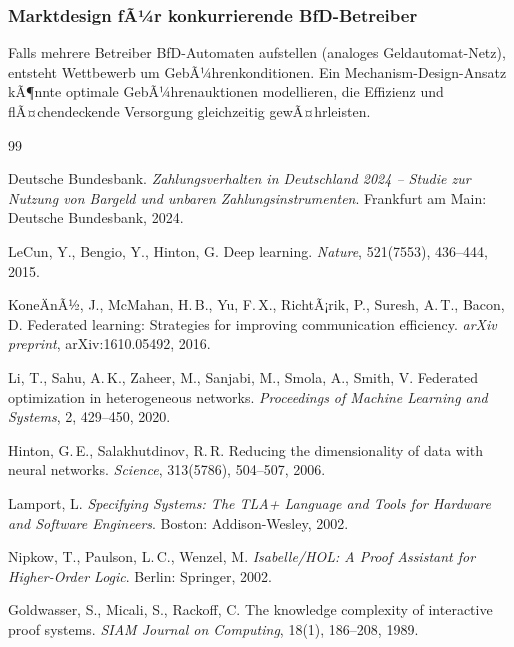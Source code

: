 ﻿\documentclass[a4paper,12pt]{article}
\theoremstyle{definition}
\begin{document}
\subsubsection{Marktdesign fÃ¼r konkurrierende BfD-Betreiber}

Falls mehrere Betreiber BfD-Automaten aufstellen (analoges Geldautomat-Netz),
entsteht Wettbewerb um GebÃ¼hrenkonditionen.  Ein Mechanism-Design-Ansatz \cite{myerson1979}
kÃ¶nnte optimale GebÃ¼hrenauktionen modellieren, die Effizienz und
flÃ¤chendeckende Versorgung gleichzeitig gewÃ¤hrleisten.

\begin{thebibliography}{99}

  Deutsche Bundesbank.
  \emph{Zahlungsverhalten in Deutschland 2024 -- Studie zur Nutzung von Bargeld und
  unbaren Zahlungsinstrumenten}.
  Frankfurt am Main: Deutsche Bundesbank, 2024.

  LeCun, Y., Bengio, Y., Hinton, G.
  Deep learning.
  \emph{Nature}, 521(7553), 436--444, 2015.

  KoneÄnÃ½, J., McMahan, H.\,B., Yu, F.\,X., RichtÃ¡rik, P., Suresh, A.\,T.,
  Bacon, D.
  Federated learning: Strategies for improving communication efficiency.
  \emph{arXiv preprint}, arXiv:1610.05492, 2016.

  Li, T., Sahu, A.\,K., Zaheer, M., Sanjabi, M., Smola, A., Smith, V.
  Federated optimization in heterogeneous networks.
  \emph{Proceedings of Machine Learning and Systems}, 2, 429--450, 2020.

  Hinton, G.\,E., Salakhutdinov, R.\,R.
  Reducing the dimensionality of data with neural networks.
  \emph{Science}, 313(5786), 504--507, 2006.

  Lamport, L.
  \emph{Specifying Systems: The TLA+ Language and Tools for Hardware and
  Software Engineers}.
  Boston: Addison-Wesley, 2002.

  Nipkow, T., Paulson, L.\,C., Wenzel, M.
  \emph{Isabelle/HOL: A Proof Assistant for Higher-Order Logic}.
  Berlin: Springer, 2002.

  Goldwasser, S., Micali, S., Rackoff, C.
  The knowledge complexity of interactive proof systems.
  \emph{SIAM Journal on Computing}, 18(1), 186--208, 1989.


\end{thebibliography}
\end{document}
